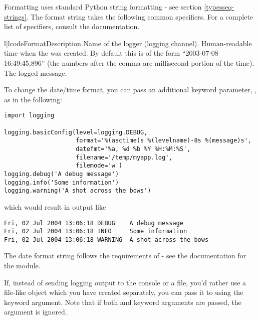 Formatting uses standard Python string formatting - see section
\ref{typesseq-strings}. The format string takes the following
common specifiers. For a complete list of specifiers, consult the
 documentation.

\begin{tableii}{l|l}{code}{Format}{Description}
     {Name of the logger (logging channel).}
  {Human-readable time when the 
                        was created.  By default this is of the form
                        ``2003-07-08 16:49:45,896'' (the numbers after the
                        comma are millisecond portion of the time).}
  {The logged message.}
\end{tableii}

To change the date/time format, you can pass an additional keyword parameter,
, as in the following:

\begin{verbatim}
import logging

logging.basicConfig(level=logging.DEBUG,
                    format='%(asctime)s %(levelname)-8s %(message)s',
                    datefmt='%a, %d %b %Y %H:%M:%S',
                    filename='/temp/myapp.log',
                    filemode='w')
logging.debug('A debug message')
logging.info('Some information')
logging.warning('A shot across the bows')
\end{verbatim}

which would result in output like

\begin{verbatim}
Fri, 02 Jul 2004 13:06:18 DEBUG    A debug message
Fri, 02 Jul 2004 13:06:18 INFO     Some information
Fri, 02 Jul 2004 13:06:18 WARNING  A shot across the bows
\end{verbatim}

The date format string follows the requirements of  -
see the documentation for the  module.

If, instead of sending logging output to the console or a file, you'd rather
use a file-like object which you have created separately, you can pass it
to  using the  keyword argument. Note
that if both  and  keyword arguments are passed,
the  argument is ignored.

